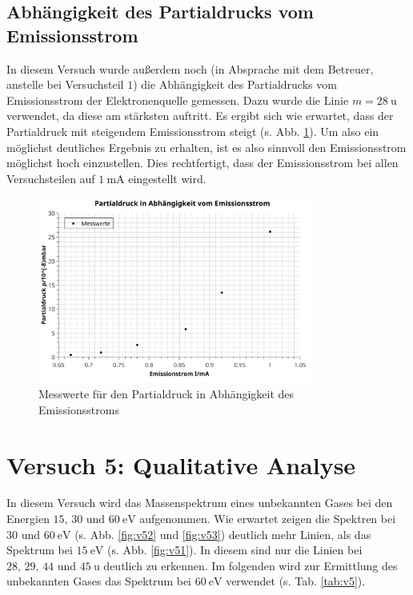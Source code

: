 \subsection{Abhängigkeit des Partialdrucks vom Emissionsstrom}

In diesem Versuch wurde außerdem noch (in Absprache mit dem Betreuer, anstelle bei Versuchsteil $1$) die Abhängigkeit des Partialdrucks vom Emissionsstrom der Elektronenquelle gemessen. Dazu wurde die Linie $m=\SI{28}{\amu}$ verwendet, da diese am stärksten auftritt.
Es ergibt sich wie erwartet, dass der Partialdruck mit steigendem Emissionsstrom steigt (s. Abb. \ref{fig:v43}). Um also ein möglichst deutliches Ergebnis zu erhalten, ist es also sinnvoll den Emissionsstrom möglichst hoch einzustellen. Dies rechtfertigt, dass der Emissionsstrom bei allen Versuchsteilen auf $\SI{1}{\milli\ampere}$ eingestellt wird.

\begin{figure}[tb]
	\centering\includegraphics[width=0.8\textwidth]{fig/a4_emissionsstrom.pdf}
	\caption{Messwerte für den Partialdruck in Abhängigkeit des Emissionsstroms}
	\label{fig:v43}
\end{figure}

\section{Versuch 5: Qualitative Analyse}

In diesem Versuch wird das Massenspektrum eines unbekannten Gases bei den Energien $15, \, 30$ und $\SI{60}{\electronvolt}$ aufgenommen. Wie erwartet zeigen die Spektren bei $30$ und $\SI{60}{\electronvolt}$ (s. Abb. \ref{fig:v52} und \ref{fig:v53}) deutlich mehr Linien, als das Spektrum bei $\SI{15}{\electronvolt}$ (s. Abb. \ref{fig:v51}).
In diesem sind nur die Linien bei $28, \, 29, \, 44$ und $\SI{45}{\amu}$ deutlich zu erkennen. Im folgenden wird zur Ermittlung des unbekannten Gases das Spektrum bei $\SI{60}{\electronvolt}$ verwendet (s. Tab. \ref{tab:v5}).


